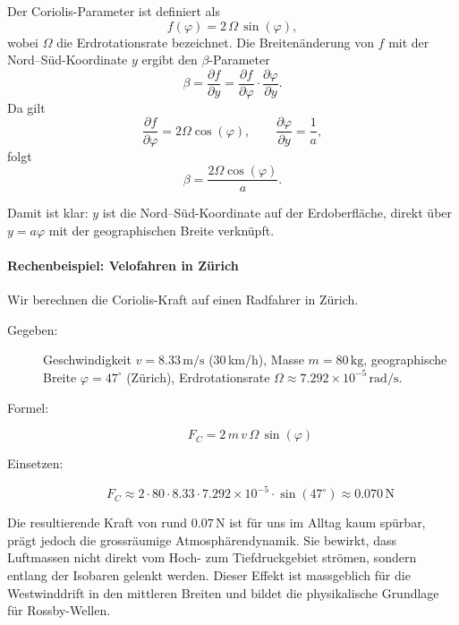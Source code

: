 Der Coriolis-Parameter ist definiert als
\begin{equation}
	f(\varphi) = 2 \, \Omega \, \sin(\varphi),
\end{equation}
wobei \(\Omega\) die Erdrotationsrate bezeichnet.
Die Breitenänderung von \(f\) mit der Nord–Süd-Koordinate \(y\) ergibt den \(\beta\)-Parameter
\begin{equation}
	\beta = \frac{\partial f}{\partial y}
	= \frac{\partial f}{\partial \varphi} \cdot \frac{\partial \varphi}{\partial y}.
\end{equation}
Da gilt
\begin{equation}
	\frac{\partial f}{\partial \varphi} = 2 \Omega \cos(\varphi),
	\qquad
	\frac{\partial \varphi}{\partial y} = \frac{1}{a},
\end{equation}
folgt
\begin{equation}
	\beta = \frac{2 \Omega \cos(\varphi)}{a}.
\end{equation}

Damit ist klar: \(y\) ist die Nord–Süd-Koordinate auf der Erdoberfläche, direkt
über \(y = a \varphi\) mit der geographischen Breite verknüpft.

\begin{beispiel}
	\paragraph{Rechenbeispiel: Velofahren in Zürich}

	Wir berechnen die Coriolis-Kraft auf einen Radfahrer in Zürich.

	\begin{description}
		\item[Gegeben:] Geschwindigkeit \(v = 8.33\,\mathrm{m/s}\) (30\,km/h), Masse \(m =
		      80\,\mathrm{kg}\), geographische Breite \(\varphi = 47^\circ\) (Zürich),
		      Erdrotationsrate \(\Omega \approx 7.292 \times 10^{-5}\,\mathrm{rad/s}\).
		\item[Formel:]
		      \[
			      F_C = 2\,m\,v\,\Omega\,\sin(\varphi)
		      \]
		\item[Einsetzen:]
		      \[
			      F_C \approx 2 \cdot 80 \cdot 8.33 \cdot 7.292 \times 10^{-5} \cdot \sin(47^\circ)
			      \approx 0.070\,\mathrm{N}
		      \]
	\end{description}

\end{beispiel}
\noindent
Die resultierende Kraft von rund \(0.07\,\mathrm{N}\) ist für uns im Alltag kaum spürbar, prägt jedoch die grossräumige Atmosphärendynamik.
Sie bewirkt, dass Luftmassen nicht direkt vom Hoch- zum Tiefdruckgebiet strömen, sondern entlang der Isobaren gelenkt werden.
Dieser Effekt ist massgeblich für die Westwinddrift in den mittleren Breiten und bildet die physikalische Grundlage für Rossby-Wellen.


